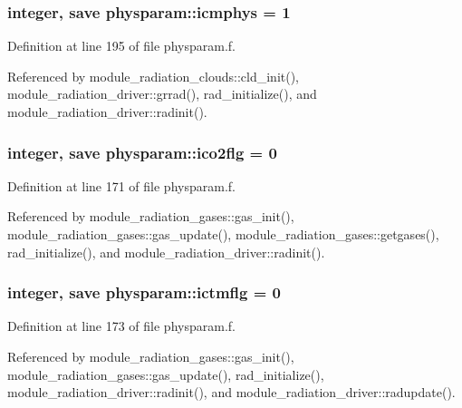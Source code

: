 \subsubsection[{\texorpdfstring{icmphys}{icmphys}}]{\setlength{\rightskip}{0pt plus 5cm}integer, save physparam\+::icmphys = 1}\hypertarget{namespacephysparam_af259ebea0c378b3b07343141977db03e}{}\label{namespacephysparam_af259ebea0c378b3b07343141977db03e}


Definition at line 195 of file physparam.\+f.



Referenced by module\+\_\+radiation\+\_\+clouds\+::cld\+\_\+init(), module\+\_\+radiation\+\_\+driver\+::grrad(), rad\+\_\+initialize(), and module\+\_\+radiation\+\_\+driver\+::radinit().

\subsubsection[{\texorpdfstring{ico2flg}{ico2flg}}]{\setlength{\rightskip}{0pt plus 5cm}integer, save physparam\+::ico2flg = 0}\hypertarget{namespacephysparam_a61baf693e83ac6144d86fb8213d39a79}{}\label{namespacephysparam_a61baf693e83ac6144d86fb8213d39a79}


Definition at line 171 of file physparam.\+f.



Referenced by module\+\_\+radiation\+\_\+gases\+::gas\+\_\+init(), module\+\_\+radiation\+\_\+gases\+::gas\+\_\+update(), module\+\_\+radiation\+\_\+gases\+::getgases(), rad\+\_\+initialize(), and module\+\_\+radiation\+\_\+driver\+::radinit().

\subsubsection[{\texorpdfstring{ictmflg}{ictmflg}}]{\setlength{\rightskip}{0pt plus 5cm}integer, save physparam\+::ictmflg = 0}\hypertarget{namespacephysparam_a4eef5ac5e5b83526d5da7de493cfe73d}{}\label{namespacephysparam_a4eef5ac5e5b83526d5da7de493cfe73d}


Definition at line 173 of file physparam.\+f.



Referenced by module\+\_\+radiation\+\_\+gases\+::gas\+\_\+init(), module\+\_\+radiation\+\_\+gases\+::gas\+\_\+update(), rad\+\_\+initialize(), module\+\_\+radiation\+\_\+driver\+::radinit(), and module\+\_\+radiation\+\_\+driver\+::radupdate().

